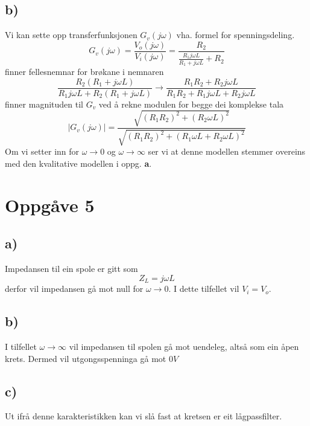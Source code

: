 \documentclass[12pt,a4paper]{article}
\begin{document}
  \subsection*{b)}
    Vi kan sette opp transferfunksjonen $G_v(j\omega)$ vha. formel for spenningsdeling.
    \begin{equation}
      G_v(j\omega) = \frac{V_o(j\omega)}{V_i(j\omega)} =
      \frac{R_2}{\frac{R_1j\omega L}{R_1 + j\omega L} + R_2}
    \end{equation}
    finner fellesnemnar for brøkane i nemnaren
    \begin{equation}
      \frac{R_2(R_1 + j\omega L)}{R_1j\omega L + R_2(R_1 + j\omega L)} \rightarrow
      \frac{R_1R_2 + R_2j\omega L}{R_1R_2 + R_1j\omega L + R_2 j\omega L}
    \end{equation}
    finner magnituden til $G_v$ ved å rekne modulen for begge dei komplekse tala
    \begin{equation}
      |G_v(j\omega)| = \frac{\sqrt{(R_1R_2)^2 + (R_2 \omega L)^2}}
      {\sqrt{(R_1R_2)^2 + (R_1\omega L + R_2 \omega L)^2}}
    \end{equation}
    Om vi setter inn for $\omega \rightarrow 0$ og $\omega \rightarrow \infty$ ser vi at
    denne modellen stemmer overeins med den kvalitative modellen i oppg. \textbf{a}.

  \section*{Oppgåve 5}
    \subsection*{a)}
    Impedansen til ein spole er gitt som
    \begin{equation}
      Z_L = j\omega L
    \end{equation}
    derfor vil impedansen gå mot null for $\omega \rightarrow 0$. I dette tilfellet vil
    $V_i = V_o$.

    \subsection*{b)}
    I tilfellet $\omega \rightarrow \infty$ vil impedansen til spolen gå mot
    uendeleg, altså som ein åpen krets.  Dermed vil utgongsspenninga gå mot $0V$

    \subsection*{c)}
    Ut ifrå denne karakteristikken kan vi slå fast at kretsen er eit lågpassfilter.
\end{document}
